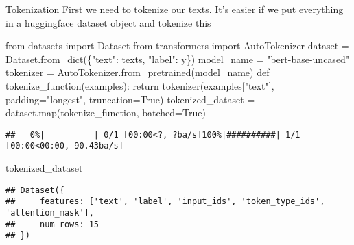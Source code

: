 \documentclass[
  10pt,
  ignorenonframetext,
  aspectratio=169]{beamer}
\newenvironment{Shaded}{\begin{snugshade}}{\end{snugshade}}
\newcommand{\BuiltInTok}[1]{\textcolor[rgb]{0.80,0.80,0.80}{#1}}
\newcommand{\ControlFlowTok}[1]{\textcolor[rgb]{0.94,0.87,0.69}{#1}}
\newcommand{\ImportTok}[1]{\textcolor[rgb]{0.80,0.80,0.80}{#1}}
\newcommand{\KeywordTok}[1]{\textcolor[rgb]{0.94,0.87,0.69}{#1}}
\newcommand{\NormalTok}[1]{\textcolor[rgb]{0.80,0.80,0.80}{#1}}
\newcommand{\OperatorTok}[1]{\textcolor[rgb]{0.94,0.94,0.82}{#1}}
\newcommand{\StringTok}[1]{\textcolor[rgb]{0.80,0.58,0.58}{#1}}
\newcommand{\VariableTok}[1]{\textcolor[rgb]{0.80,0.80,0.80}{#1}}
\begin{document}
\begin{frame}[fragile]{Tokenization}
\protect\hypertarget{tokenization}{}
First we need to tokenize our texts. It's easier if we put everything in
a huggingface dataset object and tokenize this

\medskip
\scriptsize

\begin{Shaded}
\begin{Highlighting}[]
\ImportTok{from}\NormalTok{ datasets }\ImportTok{import}\NormalTok{ Dataset}
\ImportTok{from}\NormalTok{ transformers }\ImportTok{import}\NormalTok{ AutoTokenizer}
\NormalTok{dataset }\OperatorTok{=}\NormalTok{ Dataset.from\_dict(\{}\StringTok{"text"}\NormalTok{: texts, }\StringTok{"label"}\NormalTok{: y\})}
\NormalTok{model\_name }\OperatorTok{=} \StringTok{"bert{-}base{-}uncased"}
\NormalTok{tokenizer }\OperatorTok{=}\NormalTok{ AutoTokenizer.from\_pretrained(model\_name)}
\KeywordTok{def}\NormalTok{ tokenize\_function(examples):}
    \ControlFlowTok{return}\NormalTok{ tokenizer(examples[}\StringTok{"text"}\NormalTok{], padding}\OperatorTok{=}\StringTok{"longest"}\NormalTok{, truncation}\OperatorTok{=}\VariableTok{True}\NormalTok{)}
\NormalTok{tokenized\_dataset }\OperatorTok{=}\NormalTok{ dataset.}\BuiltInTok{map}\NormalTok{(tokenize\_function, batched}\OperatorTok{=}\VariableTok{True}\NormalTok{)}
\end{Highlighting}
\end{Shaded}

\begin{verbatim}
##   0%|          | 0/1 [00:00<?, ?ba/s]100%|##########| 1/1 [00:00<00:00, 90.43ba/s]
\end{verbatim}

\begin{Shaded}
\begin{Highlighting}[]
\NormalTok{tokenized\_dataset}
\end{Highlighting}
\end{Shaded}

\begin{verbatim}
## Dataset({
##     features: ['text', 'label', 'input_ids', 'token_type_ids', 'attention_mask'],
##     num_rows: 15
## })
\end{verbatim}
\end{frame}
\end{document}
